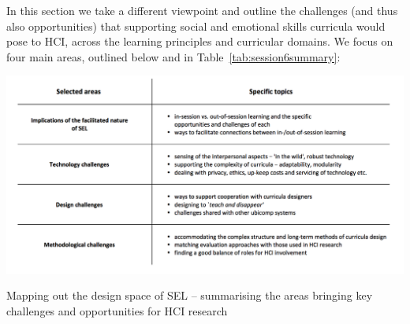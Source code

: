 \documentclass[prodmode,acmtochi]{acmsmall}
\begin{document}
In this section we take a different viewpoint and outline the challenges (and thus also opportunities) that supporting social and emotional skills curricula would pose to HCI, across the learning principles and curricular domains. We focus on four main areas, outlined below and in Table~\ref{tab:session6summary}:


\begin{table}
  \centering
        \includegraphics[width=\textwidth]{images/Section6Summary.png}
        \caption{Mapping out the design space of SEL -- summarising the areas bringing key challenges and opportunities for HCI research}
        \label{tab:session6summary}
\end{table}
\end{document}

